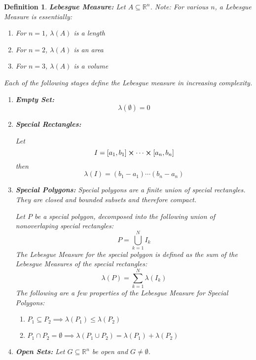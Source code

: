 \documentclass[]{article}
\newcommand{\R}{\mathbb{R}}
\newtheorem{definition}{Definition}
\begin{document}
\begin{definition}
    \emph{\textbf{Lebesgue Measure:}}
    Let $A \subseteq \R^n$. 
    \emph{Note:} 
    For various $n$, a Lebesgue Measure is essentially:\begin{enumerate}
        \item For $n=1$, $\lambda(A)$ is a length
        \item For $n=2$, $\lambda(A)$ is an area
        \item For $n=3$, $\lambda(A)$ is a volume
    \end{enumerate}
    Each of the following stages define the Lebesgue measure in increasing complexity. \begin{enumerate}
        \item \emph{\textbf{Empty Set:}} \[
            \lambda(\emptyset) = 0
        \] 
        \item \emph{\textbf{Special Rectangles:}}
        
        Let \[
            I = [a_1, b_1] \cross \cdots \cross [a_n, b_n]
        \] then \[
            \lambda(I) = (b_1 - a_1) \cdots (b_n - a_n)
        \]
        \item \emph{\textbf{Special Polygons:}}
        Special polygons are a finite union of special rectangles. 
        They are closed and bounded subsets and therefore compact. 
        
        Let $P$ be a special polygon, decomposed into the following union of nonoverlaping special rectangles: \[
            P = \bigcup_{k=1}^{N} I_k
        \] The Lebesgue Measure for the special polygon is defined as the sum of the Lebesgue Measures of the special rectangles:\[
            \lambda(P) = \sum_{k=1}^{N} \lambda(I_k)
        \] The following are a few properties of the Lebesgue Measure for Special Polygons:\begin{enumerate}
            \item $P_1 \subseteq P_2 \implies \lambda(P_1) \leq \lambda(P_2)$
            \item $P_1 \cap P_2 = \emptyset \implies \lambda(P_1 \cup P_2) = \lambda(P_1) + \lambda(P_2)$
        \end{enumerate}
        \item \emph{\textbf{Open Sets:}}
        Let $G \subseteq \R^n$ be open and $G \neq \emptyset$. 


\end{enumerate}
\end{definition}
\end{document}
